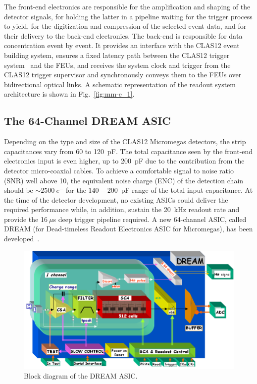 The front-end electronics are responsible for the amplification and shaping of the detector signals, for holding the latter in a
pipeline waiting for the trigger process to yield, for the digitization and compression of the selected event data, and for their
delivery to the back-end electronics. The back-end is responsible for data concentration event by event. It provides an interface
with the CLAS12 event building system, ensures a fixed latency path between the CLAS12 trigger system~\cite{trigger-nim} 
and the FEUs, and receives the system clock and trigger from the CLAS12 trigger supervisor and synchronously conveys 
them to the FEUs over bidirectional optical links. A schematic representation of the readout system architecture is 
shown in Fig.~\ref{fig:mm-e_1}.

\subsection{The 64-Channel DREAM ASIC}

Depending on the type and size of the CLAS12 Micromegas detectors, the strip capacitances vary from 60 to 120~pF. The total
capacitance seen by the front-end electronics input is even higher, up to 200~pF due to the contribution from the detector
micro-coaxial cables. To achieve a comfortable signal to noise ratio (SNR) well above 10, the equivalent noise charge (ENC) of the
detection chain should be $\sim2500~e^-$ for the $140-200$~pF range of the total input capacitance. At the time of the
detector development, no existing ASICs could deliver the required performance while, in addition, sustain the 20~kHz readout
rate and provide the 16$~\mu$s deep trigger pipeline required. A new 64-channel ASIC, called DREAM (for Dead-timeless
Readout Electronics ASIC for Micromegas), has been developed~\cite{DRM}. 

\begin{figure}[htb]
 \includegraphics[width=1.0\columnwidth,keepaspectratio]{images/electronics_fig2.png}
 \caption{Block diagram of the DREAM ASIC.}
 \label{fig:mm-e_2}
\end{figure}


